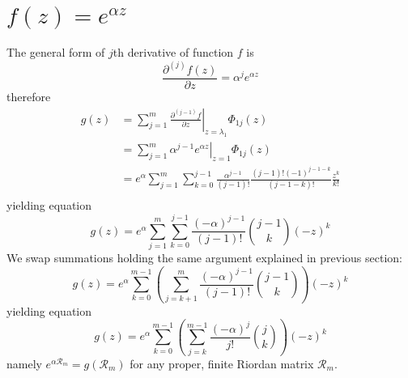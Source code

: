 \section{$f(z)=e^{\alpha z}$}

The general form of $j$th derivative of function $f$ is 
$$\frac{\partial^{(j)}{f}(z)}{\partial{z}} = \alpha^{j} e^{\alpha z}$$ 
therefore
\begin{displaymath}
\begin{split}
  g(z) &= \sum_{j=1}^{m}{ \left. \frac{\partial^{(j-1)}{f}}{\partial{z}} \right|_{z=\lambda_{1}}\Phi_{1j}(z)} \\
       &= \sum_{j=1}^{m}{ \left. \alpha^{j-1} e^{\alpha z} \right|_{z=1}\Phi_{1j}(z)} \\
       &= e^{\alpha}\sum_{j=1}^{m}{\sum_{k=0}^{j-1}{\frac{\alpha^{j-1}}{(j-1)!}  \frac{(j-1)!(-1)^{j-1-k}}{(j-1-k)!}\frac{z^{k}}{k!}}}\\
\end{split}
\end{displaymath}
yielding equation
\begin{equation}
  g(z) = e^{\alpha}\sum_{j=1}^{m}{\sum_{k=0}^{j-1}{\frac{(-\alpha)^{j-1}}{(j-1)!}{{j-1}\choose{k}}(-z)^{k}}} 
\end{equation}
We swap summations holding the same argument explained in previous section:
\begin{displaymath}
  g(z) = e^{\alpha}\sum_{k=0}^{m-1}{\left(\sum_{j=k+1}^{m}{\frac{(-\alpha)^{j-1}}{(j-1)!}{{j-1}\choose{k}}}\right)(-z)^{k}}
\end{displaymath}
yielding equation
\begin{equation}
  g(z) = e^{\alpha}\sum_{k=0}^{m-1}{\left(\sum_{j=k}^{m-1}{\frac{(-\alpha)^{j}}{j!}{{j}\choose{k}}}\right)(-z)^{k}}
\end{equation}
namely $e^{\alpha\mathcal{R}_{m}}=g(\mathcal{R}_{m})$ for any proper, 
finite Riordan matrix $\mathcal{R}_{m}$.

